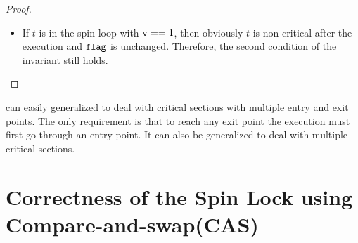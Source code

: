 \documentclass{article}[10pt]
\begin{document}
\begin{proof}
\begin{itemize}
\begin{itemize}
\begin{itemize}
      \end{itemize}

      \item If $t$ is in the spin loop with $\text{\ttfamily v} == 1$, then obviously
        $t$ is non-critical after the execution and $\text{\ttfamily flag}$ is
        unchanged. Therefore, the second condition of the invariant
        still holds.
    \end{itemize}
  \end{itemize}
\end{proof}

 can easily generalized to deal
with critical sections with multiple entry and exit points. The only
requirement is that to reach any exit point the execution must first
go through an entry point. It can also be generalized to deal with
multiple critical sections.


\section{Correctness of the Spin Lock using Compare-and-swap(CAS)}
\label{sec:spin-lock-cas}
\end{document}
